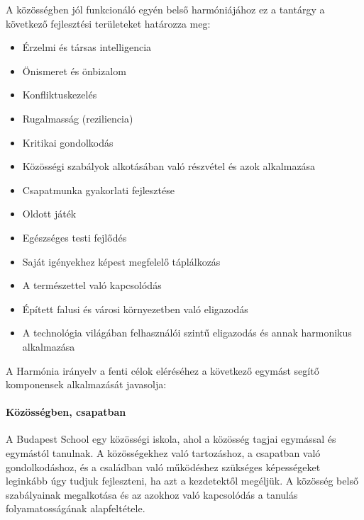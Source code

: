 A közösségben jól funkcionáló egyén belső harmóniájához ez a tantárgy a következő fejlesztési területeket határozza meg:
\begin{itemize}
  \item Érzelmi és társas intelligencia

  \item Önismeret és önbizalom

  \item Konfliktuskezelés

  \item Rugalmasság (reziliencia)

  \item Kritikai gondolkodás

  \item Közösségi szabályok alkotásában való részvétel és azok alkalmazása

  \item Csapatmunka gyakorlati fejlesztése

  \item Oldott játék

  \item Egészséges testi fejlődés

  \item Saját igényekhez képest megfelelő táplálkozás

  \item A természettel való kapcsolódás

  \item Épített falusi és városi környezetben való eligazodás

  \item A technológia világában felhasználói szintű eligazodás és annak harmonikus alkalmazása
\end{itemize}

A Harmónia irányelv a fenti célok eléréséhez a következő egymást segítő komponensek alkalmazását javasolja:

\paragraph{Közösségben, csapatban}

A Budapest School egy közösségi iskola, ahol a közösség tagjai egymással és egymástól tanulnak. A közösségekhez való tartozáshoz, a csapatban való gondolkodáshoz, és a családban való működéshez szükséges képességeket leginkább úgy tudjuk fejleszteni, ha azt a kezdetektől megéljük. A közösség belső szabályainak megalkotása és az azokhoz való kapcsolódás a tanulás folyamatosságának alapfeltétele.

